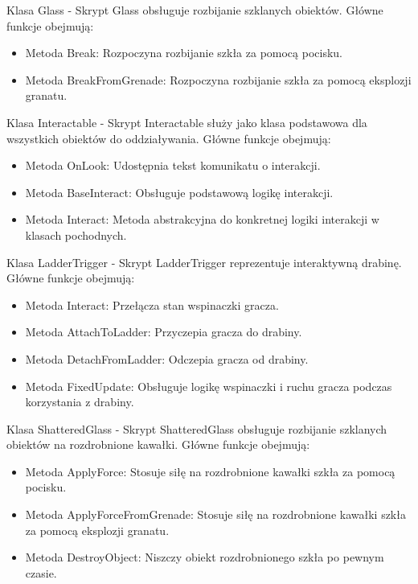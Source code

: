 Klasa Glass -
Skrypt Glass obsługuje rozbijanie szklanych obiektów. Główne funkcje obejmują:
\begin{itemize}
  \item Metoda Break: Rozpoczyna rozbijanie szkła za pomocą pocisku.
  \item Metoda BreakFromGrenade: Rozpoczyna rozbijanie szkła za pomocą eksplozji granatu.
\end{itemize}

Klasa Interactable -
Skrypt Interactable służy jako klasa podstawowa dla wszystkich obiektów do oddziaływania. Główne funkcje obejmują:
\begin{itemize}
  \item Metoda OnLook: Udostępnia tekst komunikatu o interakcji.
  \item Metoda BaseInteract: Obsługuje podstawową logikę interakcji.
  \item Metoda Interact: Metoda abstrakcyjna do konkretnej logiki interakcji w klasach pochodnych.
\end{itemize}

Klasa LadderTrigger -
Skrypt LadderTrigger reprezentuje interaktywną drabinę. Główne funkcje obejmują:
\begin{itemize}
  \item Metoda Interact: Przełącza stan wspinaczki gracza.
  \item Metoda AttachToLadder: Przyczepia gracza do drabiny.
  \item Metoda DetachFromLadder: Odczepia gracza od drabiny.
  \item Metoda FixedUpdate: Obsługuje logikę wspinaczki i ruchu gracza podczas korzystania z drabiny.
\end{itemize}

Klasa ShatteredGlass -
Skrypt ShatteredGlass obsługuje rozbijanie szklanych obiektów na rozdrobnione kawałki. Główne funkcje obejmują:
\begin{itemize}
  \item Metoda ApplyForce: Stosuje siłę na rozdrobnione kawałki szkła za pomocą pocisku.
  \item Metoda ApplyForceFromGrenade: Stosuje siłę na rozdrobnione kawałki szkła za pomocą eksplozji granatu.
  \item Metoda DestroyObject: Niszczy obiekt rozdrobnionego szkła po pewnym czasie.
\end{itemize}

